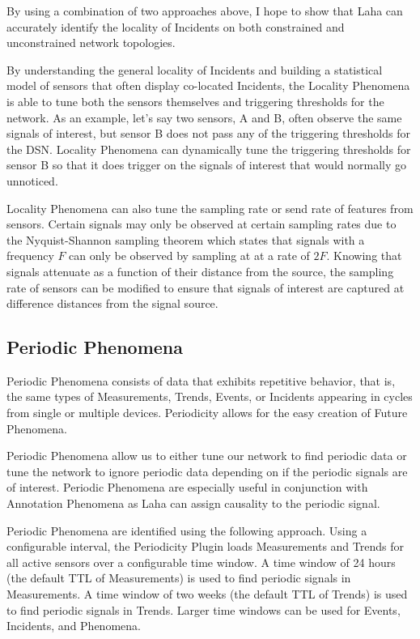 By using a combination of two approaches above, I hope to show that Laha can accurately identify the locality of Incidents on both constrained and unconstrained network topologies.

By understanding the general locality of Incidents and building a statistical model of sensors that often display co-located Incidents, the Locality Phenomena is able to tune both the sensors themselves and triggering thresholds for the network. As an example, let's say two sensors, A and B, often observe the same signals of interest, but sensor B does not pass any of the triggering thresholds for the DSN. Locality Phenomena can dynamically tune the triggering thresholds for sensor B so that it does trigger on the signals of interest that would normally go unnoticed.

Locality Phenomena can also tune the sampling rate or send rate of features from sensors. Certain signals may only be observed at certain sampling rates due to the Nyquist-Shannon sampling theorem\cite{landau1967sampling} which states that signals with a frequency $F$ can only be observed by sampling at at a rate of $2F$. Knowing that signals attenuate as a function of their distance from the source, the sampling rate of sensors can be modified to ensure that signals of interest are captured at difference distances from the signal source.

\subsection{Periodic Phenomena} \label{subsec:periodicity-phenomena}
Periodic Phenomena consists of data that exhibits repetitive behavior, that is, the same types of Measurements, Trends, Events, or Incidents appearing in cycles from single or multiple devices. Periodicity allows for the easy creation of Future Phenomena.

Periodic Phenomena allow us to either tune our network to find periodic data or tune the network to ignore periodic data depending on if the periodic signals are of interest. Periodic Phenomena are especially useful in conjunction with Annotation Phenomena as Laha can assign causality to the periodic signal.

Periodic Phenomena are identified using the following approach. Using a configurable interval, the Periodicity Plugin loads Measurements and Trends for all active sensors over a configurable time window. A time window of 24 hours (the default TTL of Measurements) is used to find periodic signals in Measurements. A time window of two weeks (the default TTL of Trends) is used to find periodic signals in Trends. Larger time windows can be used for Events, Incidents, and Phenomena.

